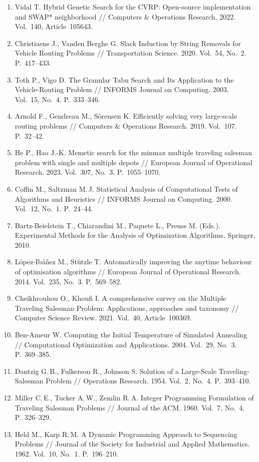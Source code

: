 \documentclass[14pt,a4paper]{extarticle}
\begin{document}
\begin{enumerate}
  \item Vidal T. Hybrid Genetic Search for the CVRP: Open-source implementation and SWAP* neighborhood // Computers \& Operations Research. 2022. Vol.~140, Article~105643.
  \item Christiaens J., Vanden Berghe G. Slack Induction by String Removals for Vehicle Routing Problems // Transportation Science. 2020. Vol.~54, No.~2. P.~417--433.
  \item Toth P., Vigo D. The Granular Tabu Search and Its Application to the Vehicle-Routing Problem // INFORMS Journal on Computing. 2003. Vol.~15, No.~4. P.~333--346.
  \item Arnold F., Gendreau M., Sörensen K. Efficiently solving very large-scale routing problems // Computers \& Operations Research. 2019. Vol.~107. P.~32--42.
  \item He P., Hao J.-K. Memetic search for the minmax multiple traveling salesman problem with single and multiple depots // European Journal of Operational Research. 2023. Vol.~307, No.~3. P.~1055--1070.
  \item Coffin M., Saltzman M.\,J. Statistical Analysis of Computational Tests of Algorithms and Heuristics // INFORMS Journal on Computing. 2000. Vol.~12, No.~1. P.~24--44.
  \item Bartz-Beielstein T., Chiarandini M., Paquete L., Preuss M. (Eds.). Experimental Methods for the Analysis of Optimization Algorithms. Springer, 2010.
  \item López-Ibáñez M., Stützle T. Automatically improving the anytime behaviour of optimisation algorithms // European Journal of Operational Research. 2014. Vol.~235, No.~3. P.~569--582.
  \item Cheikhrouhou O., Khoufi I. A comprehensive survey on the Multiple Traveling Salesman Problem: Applications, approaches and taxonomy // Computer Science Review. 2021. Vol.~40, Article~100369.
  \item Ben-Ameur W. Computing the Initial Temperature of Simulated Annealing // Computational Optimization and Applications. 2004. Vol.~29, No.~3. P.~369--385.
  \item Dantzig G.\,B., Fulkerson R., Johnson S. Solution of a Large-Scale Traveling-Salesman Problem // Operations Research. 1954. Vol.~2, No.~4. P.~393--410.
  \item Miller C.\,E., Tucker A.\,W., Zemlin R.\,A. Integer Programming Formulation of Traveling Salesman Problems // Journal of the ACM. 1960. Vol.~7, No.~4. P.~326--329.
  \item Held M., Karp R.\,M. A Dynamic Programming Approach to Sequencing Problems // Journal of the Society for Industrial and Applied Mathematics. 1962. Vol.~10, No.~1. P.~196--210.

\end{enumerate}
\end{document}
